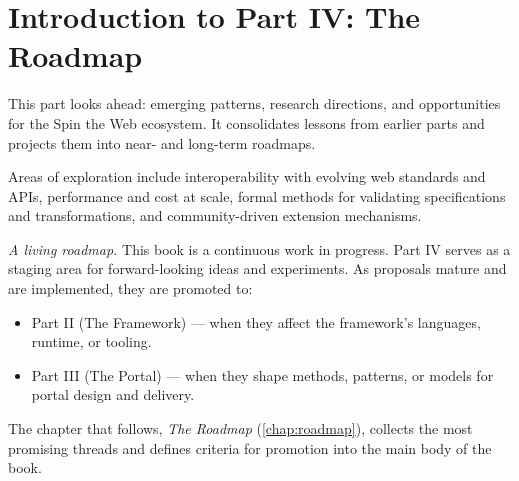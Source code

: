 
\chapter*{Introduction to Part IV: The Roadmap}
\label{part:roadmap}

This part looks ahead: emerging patterns, research directions, and opportunities for the Spin the Web ecosystem. It consolidates lessons from earlier parts and projects them into near- and long-term roadmaps.

Areas of exploration include interoperability with evolving web standards and APIs, performance and cost at scale, formal methods for validating specifications and transformations, and community-driven extension mechanisms.

\textit{A living roadmap.} This book is a continuous work in progress. Part IV serves as a staging area for forward-looking ideas and experiments. As proposals mature and are implemented, they are promoted to:
\begin{itemize}
  \item Part II (The Framework) --- when they affect the framework’s languages, runtime, or tooling.
  \item Part III (The Portal) --- when they shape methods, patterns, or models for portal design and delivery.
\end{itemize}

\noindent The chapter that follows, \emph{The Roadmap} (\cref{chap:roadmap}), collects the most promising threads and defines criteria for promotion into the main body of the book.

